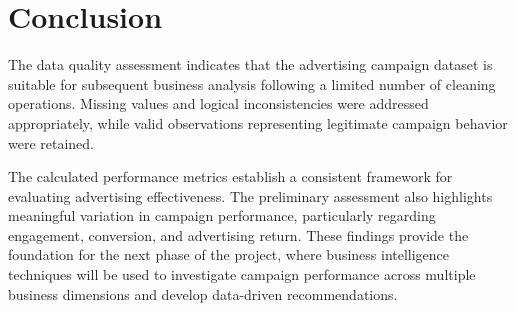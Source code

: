 \documentclass[11pt]{article}
\begin{document}
	\section{Conclusion}
	
	The data quality assessment indicates that the advertising campaign dataset is suitable for subsequent business analysis following a limited number of cleaning operations. Missing values and logical inconsistencies were addressed appropriately, while valid observations representing legitimate campaign behavior were retained.
	
	The calculated performance metrics establish a consistent framework for evaluating advertising effectiveness. The preliminary assessment also highlights meaningful variation in campaign performance, particularly regarding engagement, conversion, and advertising return. These findings provide the foundation for the next phase of the project, where business intelligence techniques will be used to investigate campaign performance across multiple business dimensions and develop data-driven recommendations.
	
\end{document}
